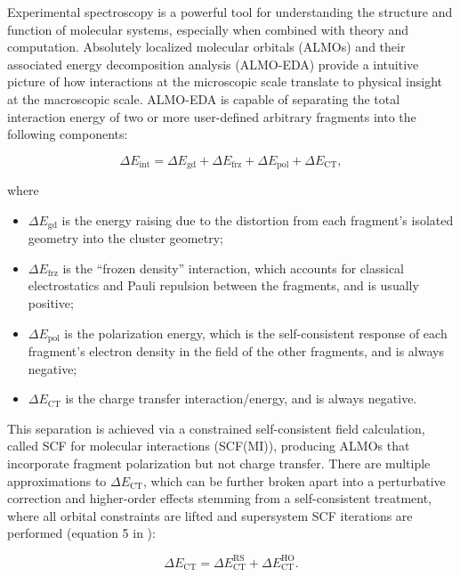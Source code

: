 Experimental spectroscopy is a powerful tool for understanding the structure and function of molecular systems, especially when combined with theory and computation\cite{AUTSCHBACH200383,NEESE2009526,doi:10.1021/cr2002239}. Absolutely localized molecular orbitals (ALMOs)\cite{Khaliullin2006} and their associated energy decomposition analysis (ALMO-EDA)\cite{Khaliullin2007} provide a intuitive picture of how interactions at the microscopic scale translate to physical insight at the macroscopic scale. ALMO-EDA is capable of separating the total interaction energy of two or more user-defined arbitrary fragments into the following components:

\begin{equation}
  \label{eq:almo-eda}
  \Delta E_{\text{int}} = \Delta E_{\text{gd}} + \Delta E_{\text{frz}} + \Delta E_{\text{pol}} + \Delta E_{\text{CT}},
\end{equation}

where

\begin{itemize}
\item \(\Delta E_{\text{gd}}\) is the energy raising due to the distortion from each fragment's isolated geometry into the cluster geometry;
\item \(\Delta E_{\text{frz}}\) is the ``frozen density'' interaction, which accounts for classical electrostatics and Pauli repulsion between the fragments, and is usually positive;
\item \(\Delta E_{\text{pol}}\) is the polarization energy, which is the self-consistent response of each fragment's electron density in the field of the other fragments, and is always negative;
\item \(\Delta E_{\text{CT}}\) is the charge transfer interaction/energy, and is always negative.
\end{itemize}

This separation is achieved via a constrained self-consistent field calculation, called SCF for molecular interactions (SCF(MI)), producing ALMOs that incorporate fragment polarization but not charge transfer. There are multiple approximations to \(\Delta E_{\text{CT}}\), which can be further broken apart into a perturbative correction and higher-order effects stemming from a self-consistent treatment, where all orbital constraints are lifted and supersystem SCF iterations are performed (equation 5 in ):

\begin{equation}
  \label{eq:almo-eda-ct}
  \Delta E_{\text{CT}} = \Delta E_{\text{CT}}^{\text{RS}} + \Delta E_{\text{CT}}^{\text{HO}}.
\end{equation}

